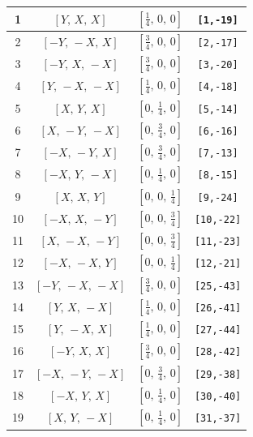 \documentclass[fleqn,8pt]{jsarticle}
\begin{document}
\begin{longtable}{cccc}
1 & $\left[ Y,\, X,\, X \right]$ & $\left[ \frac{1}{4},\, 0,\, 0 \right]$ & {\tt [1,-19]} \\ \hline
2 & $\left[ - Y,\, - X,\, X \right]$ & $\left[ \frac{3}{4},\, 0,\, 0 \right]$ & {\tt [2,-17]} \\ \hline
3 & $\left[ - Y,\, X,\, - X \right]$ & $\left[ \frac{3}{4},\, 0,\, 0 \right]$ & {\tt [3,-20]} \\ \hline
4 & $\left[ Y,\, - X,\, - X \right]$ & $\left[ \frac{1}{4},\, 0,\, 0 \right]$ & {\tt [4,-18]} \\ \hline
5 & $\left[ X,\, Y,\, X \right]$ & $\left[ 0,\, \frac{1}{4},\, 0 \right]$ & {\tt [5,-14]} \\ \hline
6 & $\left[ X,\, - Y,\, - X \right]$ & $\left[ 0,\, \frac{3}{4},\, 0 \right]$ & {\tt [6,-16]} \\ \hline
7 & $\left[ - X,\, - Y,\, X \right]$ & $\left[ 0,\, \frac{3}{4},\, 0 \right]$ & {\tt [7,-13]} \\ \hline
8 & $\left[ - X,\, Y,\, - X \right]$ & $\left[ 0,\, \frac{1}{4},\, 0 \right]$ & {\tt [8,-15]} \\ \hline
9 & $\left[ X,\, X,\, Y \right]$ & $\left[ 0,\, 0,\, \frac{1}{4} \right]$ & {\tt [9,-24]} \\ \hline
10 & $\left[ - X,\, X,\, - Y \right]$ & $\left[ 0,\, 0,\, \frac{3}{4} \right]$ & {\tt [10,-22]} \\ \hline
11 & $\left[ X,\, - X,\, - Y \right]$ & $\left[ 0,\, 0,\, \frac{3}{4} \right]$ & {\tt [11,-23]} \\ \hline
12 & $\left[ - X,\, - X,\, Y \right]$ & $\left[ 0,\, 0,\, \frac{1}{4} \right]$ & {\tt [12,-21]} \\ \hline
13 & $\left[ - Y,\, - X,\, - X \right]$ & $\left[ \frac{3}{4},\, 0,\, 0 \right]$ & {\tt [25,-43]} \\ \hline
14 & $\left[ Y,\, X,\, - X \right]$ & $\left[ \frac{1}{4},\, 0,\, 0 \right]$ & {\tt [26,-41]} \\ \hline
15 & $\left[ Y,\, - X,\, X \right]$ & $\left[ \frac{1}{4},\, 0,\, 0 \right]$ & {\tt [27,-44]} \\ \hline
16 & $\left[ - Y,\, X,\, X \right]$ & $\left[ \frac{3}{4},\, 0,\, 0 \right]$ & {\tt [28,-42]} \\ \hline
17 & $\left[ - X,\, - Y,\, - X \right]$ & $\left[ 0,\, \frac{3}{4},\, 0 \right]$ & {\tt [29,-38]} \\ \hline
18 & $\left[ - X,\, Y,\, X \right]$ & $\left[ 0,\, \frac{1}{4},\, 0 \right]$ & {\tt [30,-40]} \\ \hline
19 & $\left[ X,\, Y,\, - X \right]$ & $\left[ 0,\, \frac{1}{4},\, 0 \right]$ & {\tt [31,-37]} \\ \hline

\end{longtable}
\end{document}
